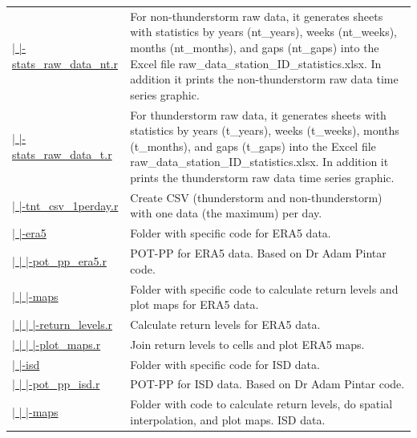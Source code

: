 \documentclass[12pt,oneside]{reedthesis}
\begin{document}
\begin{longtable}[t]{>{\raggedright\arraybackslash}p{1.3in}>{\raggedright\arraybackslash}p{4.9in}}
\href{ftp://ftp.geocorp.co/windthesis/code/pot_pp/statistics_raw_data_nt.r}{  |    |-stats\_raw\_data\_nt.r} & For non-thunderstorm raw data, it generates sheets with statistics by years (nt\_years), weeks (nt\_weeks), months (nt\_months), and gaps (nt\_gaps) into the Excel file raw\_data\_station\_ID\_statistics.xlsx. In addition it prints the non-thunderstorm raw data time series graphic.\\
\href{ftp://ftp.geocorp.co/windthesis/code/pot_pp/statistics_raw_data_t.r}{  |    |-stats\_raw\_data\_t.r} & For thunderstorm raw data, it generates sheets with statistics by years (t\_years), weeks (t\_weeks), months (t\_months), and gaps (t\_gaps) into the Excel file raw\_data\_station\_ID\_statistics.xlsx. In addition it prints the thunderstorm raw data time series graphic.\\
\href{ftp://ftp.geocorp.co/windthesis/code/pot_pp/write_t_nt_csv_one_data_per_day.r}{  |    |-tnt\_csv\_1perday.r} & Create CSV (thunderstorm and non-thunderstorm) with one data (the maximum) per day.\\
\href{ftp://ftp.geocorp.co/windthesis/code/pot_pp/era5/}{  |    |-era5} & Folder with specific code for ERA5 data.\\
\href{ftp://ftp.geocorp.co/windthesis/code/pot_pp/era5/pot_pp_era5.r}{  |    |    |-pot\_pp\_era5.r} & POT-PP for ERA5 data. Based on Dr Adam Pintar code.\\
\href{ftp://ftp.geocorp.co/windthesis/code/pot_pp/era5/maps/}{  |    |    |-maps} & Folder with specific code to calculate return levels and plot maps for ERA5 data.\\
\href{ftp://ftp.geocorp.co/windthesis/code/pot_pp/era5/maps/return_levels.r}{  |    |    |    |-return\_levels.r} & Calculate return levels for ERA5 data.\\
\href{ftp://ftp.geocorp.co/windthesis/code/pot_pp/era5/maps/plot_maps.r}{  |    |    |    |-plot\_maps.r} & Join return levels to cells and plot ERA5 maps.\\
\href{ftp://ftp.geocorp.co/windthesis/code/pot_pp/isd/}{  |    |-isd} & Folder with specific code for ISD data.\\
\href{ftp://ftp.geocorp.co/windthesis/code/pot_pp/isd/pot_pp_isd.r}{  |    |    |-pot\_pp\_isd.r} & POT-PP for ISD data. Based on Dr Adam Pintar code.\\
\href{ftp://ftp.geocorp.co/windthesis/code/pot_pp/isd/maps/}{  |    |    |-maps} & Folder with code to calculate return levels, do spatial interpolation, and plot maps. ISD data.\\

\end{longtable}
\end{document}
